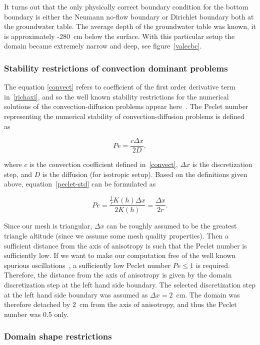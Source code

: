 \documentclass[review,times,3p,twocolumn,10pt]{elsarticle}
\newenvironment{lineq}
    {\begin{linenomath*}
    \begin{equation}
    }
    { 
    \end{equation} 
    \end{linenomath*}
    }
\begin{document}
It turns out that the only physically correct boundary condition for the bottom boundary is either the Neumann no-flow boundary or Dirichlet boundary both at the groundwater table. The average depth of the groundwater table was known, it is approximately -280~cm below the surface. With this particular setup the domain became extremely narrow and deep, see figure~\ref{valecbc}.


\subsubsection{Stability restrictions of convection dominant problems}
\label{restrconvect}

The equation \eqref{convect} refers to coefficient  of the first order derivative term in~\eqref{richaxi}, and so the well known stability restrictions for the numerical solutions of the convection-diffusion problems appear here~\cite{zienkiewicz1976}.
The Peclet number representing the numerical stability of convection-diffusion problems is defined as~\citep{knobloch2008} 
\begin{lineq}
\label{peclet-std}
Pe = \frac{c \Delta x}{2 D},
\end{lineq}
where $c$ is the convection coefficient defined in~\eqref{convect}, $\Delta x$ is the discretization step, and $D$ is the diffusion (for isotropic setup). Based on the definitions given above, equation~\eqref{peclet-std} can be formulated as
\begin{lineq}
Pe =  \frac{\frac{1}{r}K(h) \Delta x}{2K(h)} = \frac{\Delta x}{2r}.
\end{lineq}
Since our mesh is triangular, $\Delta x$ can be roughly assumed to be the greatest triangle altitude (since we assume some mesh quality properties). Then a sufficient distance from the axis of anisotropy is such that the Peclet number is sufficiently low. If we want to make our computation free of the well known spurious oscillations~\cite{zienkiewicz1976, roos-layers}, a sufficiently low Peclet number $Pe\le 1$ is required. Therefore, the distance from the axis of anisotropy is given by the domain discretization step at the left hand side boundary. The selected discretization step at the left hand side boundary was assumed as $\Delta x=2$~cm. The domain was therefore detached by 2~cm from the axis of anisotropy, and thus the Peclet number was 0.5 only.


\subsubsection{Domain shape restrictions}
\end{document}
